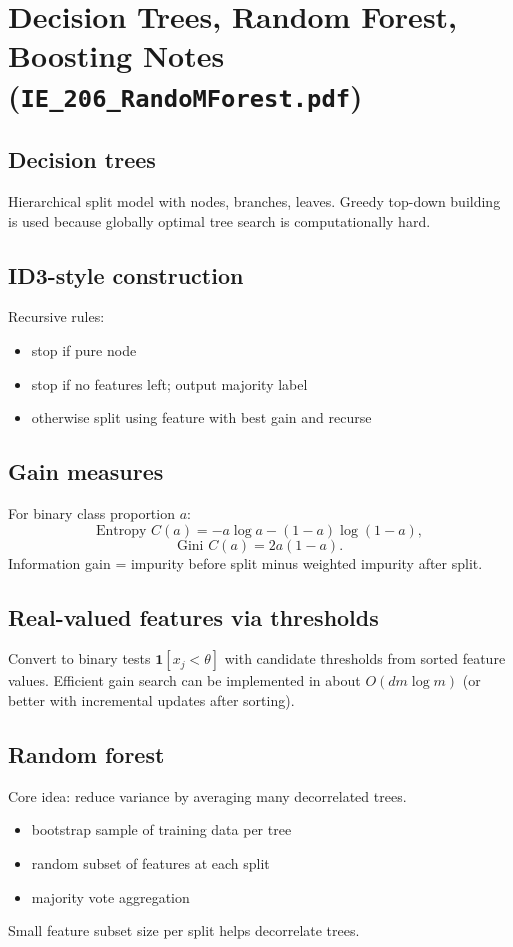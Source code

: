 \documentclass[11pt]{article}
\newcommand{\1}{\mathbf{1}}
\begin{document}
\section{Decision Trees, Random Forest, Boosting Notes (\texttt{IE\_206\_RandoMForest.pdf})}
\subsection*{Decision trees}
Hierarchical split model with nodes, branches, leaves. Greedy top-down building is used because globally optimal tree search is computationally hard.

\subsection*{ID3-style construction}
Recursive rules:
\begin{itemize}
\item stop if pure node
\item stop if no features left; output majority label
\item otherwise split using feature with best gain and recurse
\end{itemize}

\subsection*{Gain measures}
For binary class proportion $a$:
\[
\text{Entropy }C(a)=-a\log a-(1-a)\log(1-a),
\]
\[
\text{Gini }C(a)=2a(1-a).
\]
Information gain = impurity before split minus weighted impurity after split.

\subsection*{Real-valued features via thresholds}
Convert to binary tests $\1[x_j<\theta]$ with candidate thresholds from sorted feature values. Efficient gain search can be implemented in about $O(dm\log m)$ (or better with incremental updates after sorting).

\subsection*{Random forest}
Core idea: reduce variance by averaging many decorrelated trees.
\begin{itemize}
\item bootstrap sample of training data per tree
\item random subset of features at each split
\item majority vote aggregation
\end{itemize}
Small feature subset size per split helps decorrelate trees.
\end{document}
